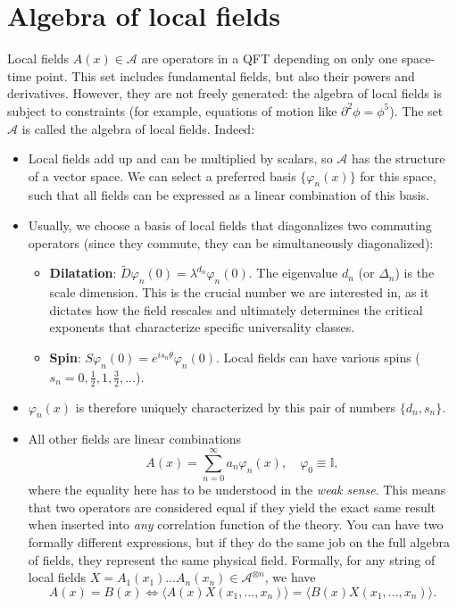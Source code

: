 \section{Algebra of local fields}
Local fields \(A(x)\in\mathcal{A}\) are operators in a QFT depending on only one space-time point. This set includes fundamental fields, but also their powers and derivatives. However, they are not freely generated: the algebra of local fields is subject to constraints (for example, equations of motion like \(\partial^2\phi = \phi^5\)). The set \(\mathcal{A}\) is called the algebra of local fields. Indeed:
\begin{itemize}
    \item Local fields add up and can be multiplied by scalars, so \(\mathcal{A}\) has the structure of a vector space. We can select a preferred basis \(\{\varphi_n(x)\}\) for this space, such that all fields can be expressed as a linear combination of this basis.
    \item Usually, we choose a basis of local fields that diagonalizes two commuting operators (since they commute, they can be simultaneously diagonalized):
          \begin{itemize}
              \item \textbf{Dilatation}: \(\tilde{D}\varphi_{n}(0)=\lambda^{d_{n}}\varphi_{n}(0)\). The eigenvalue \(d_{n}\) (or \(\Delta_n\)) is the scale dimension. This is the crucial number we are interested in, as it dictates how the field rescales and ultimately determines the critical exponents that characterize specific universality classes.
              \item \textbf{Spin}: \(S\varphi_{n}(0)=e^{is_{n}\theta}\varphi_{n}(0)\). Local fields can have various spins (\(s_n = 0, \tfrac{1}{2}, 1, \tfrac{3}{2}, \dots\)).
          \end{itemize}
    \item \(\varphi_{n}(x)\) is therefore uniquely characterized by this pair of numbers \(\{d_{n},s_{n}\}\).
    \item All other fields are linear combinations
          \[
              A(x)=\sum_{n=0}^{\infty}a_{n}\varphi_{n}(x), \quad \varphi_{0}\equiv\mathbb{I},
          \]
          where the equality here has to be understood in the \textit{weak sense}. This means that two operators are considered equal if they yield the exact same result when inserted into \textit{any} correlation function of the theory. You can have two formally different expressions, but if they do the same job on the full algebra of fields, they represent the same physical field. Formally, for any string of local fields \(X=A_{1}(x_{1})\dots A_{n}(x_{n})\in\mathcal{A}^{\otimes n}\), we have
          \[
              A(x)=B(x)\Leftrightarrow\langle A(x)X(x_{1},\dots,x_{n})\rangle=\langle B(x)X(x_{1},\dots,x_{n})\rangle.
          \]
\end{itemize}
